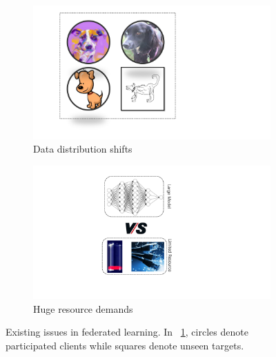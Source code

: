\documentclass[11pt]{article}
\begin{document}
\begin{figure}[t]
	\centering
	\begin{subfigure}[b]{0.45\textwidth}
		\centering
		\includegraphics[height=0.8\textwidth]{fig/issue1.pdf}
		\caption{Data distribution shifts}
		\label{fig:issue1}
	\end{subfigure}
	\begin{subfigure}[b]{0.45\textwidth}
		\centering
		\includegraphics[height=0.8\textwidth]{fig/issue2.pdf}
		\caption{Huge resource demands}
		\label{fig:issue2}
	\end{subfigure}
	\caption{Existing issues in federated learning. In \figurename~\ref{fig:issue1}, circles denote participated clients while squares denote unseen targets.}
	\label{fig:issues}
\end{figure}
\end{document}
